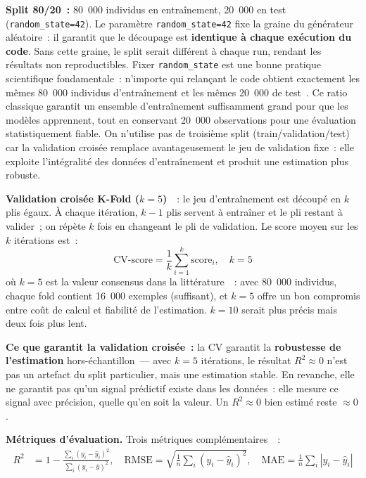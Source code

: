 \textbf{Split 80/20~:} 80~000 individus en entraînement, 20~000 en test (\texttt{random\_state=42}). Le paramètre \texttt{random\_state=42} fixe la graine du générateur aléatoire~: il garantit que le découpage est \textbf{identique à chaque exécution du code}. Sans cette graine, le split serait différent à chaque run, rendant les résultats non reproductibles. Fixer \texttt{random\_state} est une bonne pratique scientifique fondamentale~: n'importe qui relançant le code obtient exactement les mêmes 80~000 individus d'entraînement et les mêmes 20~000 de test~\cite{james2021}. Ce ratio classique garantit un ensemble d'entraînement suffisamment grand pour que les modèles apprennent, tout en conservant 20~000 observations pour une évaluation statistiquement fiable. On n'utilise pas de troisième split (train/validation/test) car la validation croisée remplace avantageusement le jeu de validation fixe~: elle exploite l'intégralité des données d'entraînement et produit une estimation plus robuste.

\textbf{Validation croisée K-Fold ($k=5$)}~\cite{hastie2009}~: le jeu d'entraînement est découpé en $k$ plis égaux. À chaque itération, $k-1$ plis servent à entraîner et le pli restant à valider~; on répète $k$ fois en changeant le pli de validation. Le score moyen sur les $k$ itérations est~:
\begin{equation}
\text{CV-score} = \frac{1}{k}\sum_{i=1}^{k} \text{score}_i, \quad k=5
\end{equation}
où $k=5$ est la valeur consensus dans la littérature~\cite{james2021}~: avec 80~000 individus, chaque fold contient 16~000 exemples (suffisant), et $k=5$ offre un bon compromis entre coût de calcul et fiabilité de l'estimation. $k=10$ serait plus précis mais deux fois plus lent.

\textbf{Ce que garantit la validation croisée~:} la CV garantit la \textbf{robustesse de l'estimation} hors-échantillon~--- avec $k=5$ itérations, le résultat $R^2 \approx 0$ n'est pas un artefact du split particulier, mais une estimation stable. En revanche, elle ne garantit pas qu'un signal prédictif existe dans les données~: elle mesure ce signal avec précision, quelle qu'en soit la valeur. Un $R^2 \approx 0$ bien estimé reste $\approx 0$.

\textbf{Métriques d'évaluation.} Trois métriques complémentaires~\cite{james2021}~:
\begin{align}
R^2 &= 1 - \frac{\sum_{i}(y_i - \hat{y}_i)^2}{\sum_{i}(y_i - \bar{y})^2}, \quad
\text{RMSE} = \sqrt{\frac{1}{n}\sum_{i}(y_i - \hat{y}_i)^2}, \quad
\text{MAE} = \frac{1}{n}\sum_{i}|y_i - \hat{y}_i|
\end{align}


